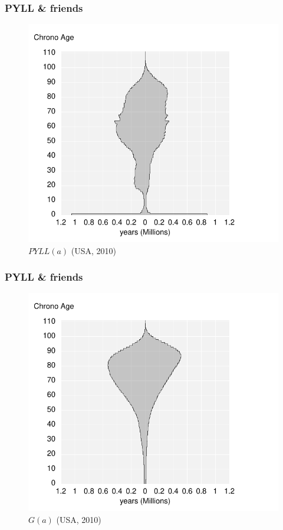 \documentclass{beamer}
\begin{document}
\begin{frame}
\frametitle{PYLL \& friends}
\vspace{-1cm}
\begin{figure}[b]
    \centering
    \includegraphics[scale=.7]{Figures/f5_Daea.pdf}
    \caption{$PYLL(a)$ (USA, 2010)}
\end{figure} 
\end{frame}
\begin{frame}
\frametitle{PYLL \& friends}
\vspace{-1cm}
\begin{figure}[b]
    \centering
    \includegraphics[scale=.7]{Figures/f6_AgesWon.pdf}
    \caption{$G(a)$ (USA, 2010)}
\end{figure} 
\end{frame}
\end{document}
